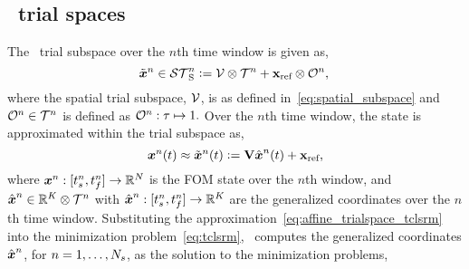 \subsection{\spatialAcronym\ trial spaces}
The \spatialAcronym\ trial subspace over the $n$th time window is given as, 
\begin{equation}\label{eq:sttrialspace}
 \tilde{\boldsymbol x}^{n} \in \mathcal{ ST }_{\text{S}}^{n} \vcentcolon= 
\mathcal{V } \otimes \mathcal{T}^{n} +
	\mathbf{x}_\text{ref}\otimes\mathcal{O}^n,\\ 
\end{equation}
where the spatial trial subspace, $\mathcal{V }$, is as defined in~\eqref{eq:spatial_subspace} and 
$\mathcal{O}^n\in\mathcal{T}^{n}$ is defined as
$\mathcal{O}^n:\tau\mapsto 1.$
Over the $n$th time window, the state is approximated within the trial subspace as, 
\begin{equation}\label{eq:affine_trialspace_tclsrm}
{\boldsymbol x}^{n}(t) \approx \tilde{\boldsymbol x}^{n}(t) \vcentcolon= \mathbf {V} \hat{ \boldsymbol x}^{n}(t) + \mathbf{x}_\text{ref},
\end{equation}
where ${\boldsymbol x}^{n}: [t_s^{n},t_f^{n}] \rightarrow \mathbb{R}^{N}$ is the FOM state over the $n$th window, and $\hat{ \boldsymbol x}^{n} \in \mathbb{R}^{K} \otimes \mathcal{T}^{n}$ with $\hat{ \boldsymbol x}^{n}: [t_s^{n},t_f^{n}] \rightarrow \mathbb{R}^{K}$ are the generalized coordinates over the $n$th time window. 
Substituting the approximation~\eqref{eq:affine_trialspace_tclsrm} into the minimization problem~\eqref{eq:tclsrm}, \methodAcronym\ computes  
the generalized coordinates $\hat{ \boldsymbol x}^{n}$, for $n = 1,\ldots,N_s$, as the solution to the minimization problems,

